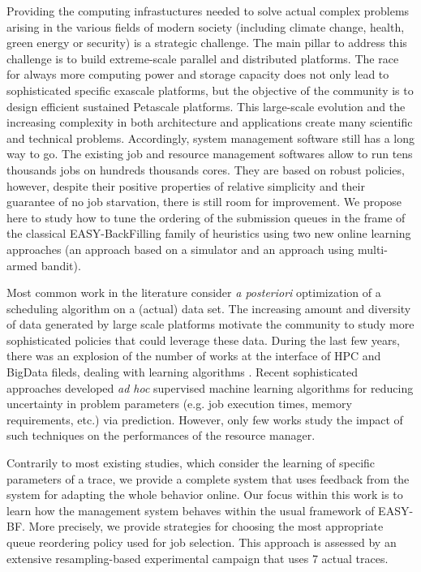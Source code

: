 \documentclass[sigconf,review]{acmart}
\begin{document}
Providing the computing infrastuctures needed to solve actual complex problems
arising in the various fields of modern society (including climate change,
health, green energy or security) is a strategic challenge. The main pillar to
address this challenge is to build extreme-scale parallel and distributed
platforms. The race for always more computing power and storage capacity does
not only lead to sophisticated specific exascale platforms, but the objective
of the community is to design efficient sustained Petascale platforms. This
large-scale evolution and the increasing complexity in both architecture and
applications create many scientific and technical problems. Accordingly, system
management software still has a long way to go. The existing job and resource
management softwares allow to run tens thousands jobs on hundreds thousands
cores. They are based on robust policies, however, despite their positive
properties of relative simplicity and their guarantee of no job starvation,
there is still room for improvement. We propose here to study how to tune the
ordering of the submission queues in the frame of the classical
EASY-BackFilling family of heuristics using two new online learning approaches
(an approach based on a simulator and an approach using multi-armed bandit).

Most common work in the literature consider \textit{a posteriori} optimization
of a scheduling algorithm on a (actual) data set.  The increasing amount and
diversity of data generated by large scale platforms motivate the community to
study more sophisticated policies that could leverage these data.  During the
last few years, there was an explosion of the number of works at the interface
of HPC and BigData fileds, dealing with learning algorithms .  Recent
sophisticated approaches developed \textit{ad hoc} supervised machine learning
algorithms for reducing uncertainty in problem parameters (e.g. job execution
times, memory requirements, etc.) via prediction.  However, only few works
study the impact of such techniques on the performances of the resource
manager.

Contrarily to most existing studies, which consider the learning of specific
parameters of a trace, we provide a complete system that uses feedback from the
system for adapting the whole behavior online.  Our focus within this work is
to learn how the management system behaves within the usual framework of
EASY-BF.  More precisely, we provide strategies for choosing the most
appropriate queue reordering policy used for job selection.  This approach is
assessed by an extensive resampling-based experimental campaign that uses 7
actual traces.
\end{document}
